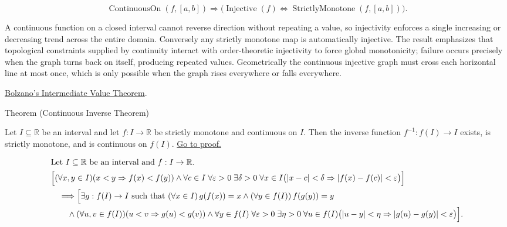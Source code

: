 \begin{remark*}
\[
\operatorname{ContinuousOn}(f,[a,b]) \Longrightarrow
\bigl(\operatorname{Injective}(f) \Longleftrightarrow
\operatorname{StrictlyMonotone}(f,[a,b])\bigr).
\]
\end{remark*}

\begin{remark*}[Interpretation]
A continuous function on a closed interval cannot reverse direction without repeating a value, so injectivity enforces a single increasing or decreasing trend across the entire domain. Conversely any strictly monotone map is automatically injective. The result emphasizes that topological constraints supplied by continuity interact with order-theoretic injectivity to force global monotonicity; failure occurs precisely when the graph turns back on itself, producing repeated values. Geometrically the continuous injective graph must cross each horizontal line at most once, which is only possible when the graph rises everywhere or falls everywhere.
\end{remark*}

\begin{dependencies}
\hyperref[thm:bolzano-intermediate-value]{Bolzano's Intermediate Value Theorem}.
\end{dependencies}

\begin{theorembox}{Theorem (Continuous Inverse Theorem)}
\begin{theorem}
\label{thm:continuous-inverse-theorem}
Let $I\subseteq\mathbb{R}$ be an interval and let $f:I\to\mathbb{R}$ be strictly monotone and continuous on $I$. Then the inverse function $f^{-1}:f(I)\to I$ exists, is strictly monotone, and is continuous on $f(I)$.
\hyperref[prf:continuous-inverse-theorem]{Go to proof.}
\end{theorem}
\end{theorembox}

\begin{remark*}
\[
\begin{aligned}
&\text{Let } I\subseteq\mathbb{R} \text{ be an interval and } f:I\to\mathbb{R}.\\
&\Bigl[(\forall x,y\in I)(x<y \Rightarrow f(x)<f(y)) \land \forall c\in I\;\forall \varepsilon>0\;\exists \delta>0\;\forall x\in I\bigl(|x-c|<\delta \Rightarrow |f(x)-f(c)|<\varepsilon\bigr)\Bigr]\\
&\quad\Longrightarrow \Bigl[\exists g:f(I)\to I \text{ such that } (\forall x\in I)\, g(f(x))=x \land (\forall y\in f(I))\, f(g(y))=y\\
&\qquad\land (\forall u,v\in f(I))(u<v \Rightarrow g(u)<g(v)) \land \forall y\in f(I)\;\forall \varepsilon>0\;\exists \eta>0\;\forall u\in f(I)\bigl(|u-y|<\eta \Rightarrow |g(u)-g(y)|<\varepsilon\bigr)\Bigr].
\end{aligned}
\]
\end{remark*}

